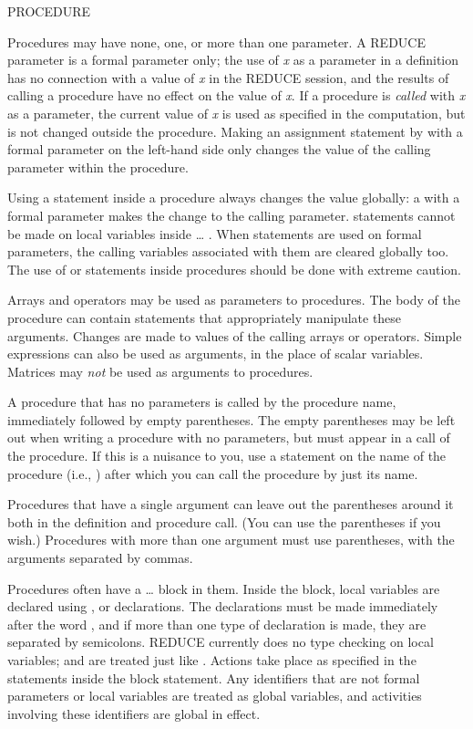 \begin{Command}[procedure]{PROCEDURE}
\begin{Comments}
Procedures may have none, one, or more than one parameter.  A REDUCE
parameter is a formal parameter only; the use of {\it x} as a parameter in
a  definition has no connection with a value of {\it x} in
the REDUCE session, and the results of calling a procedure have no effect
on the value of {\it x}.  If a procedure is {\it called} with {\it x} as a
parameter, the current value of {\it x} is used as specified in the
computation, but is not changed outside the procedure.
Making an assignment statement by \name{:=} with a
formal parameter on the left-hand side only changes the value of the
calling parameter within the procedure.

Using a  statement inside a procedure always changes the value
globally: a  with a formal parameter makes the change to the calling
parameter.   statements cannot be made on local variables inside
\ldots{} .  
When  statements are used on formal
parameters, the calling variables associated with them are cleared globally too.
The use of  or  statements inside procedures 
should be done with extreme caution.

Arrays and operators may be used as parameters to procedures.  The body of the
procedure can contain statements that appropriately manipulate these
arguments.  Changes are made to values of the calling arrays or operators.
Simple expressions can also be used as arguments, in the place of scalar
variables.  Matrices may {\it not} be used as arguments to procedures.

A procedure that has no parameters is called by the procedure name,
immediately followed by empty parentheses.  The empty parentheses may be left
out when writing a procedure with no parameters, but must appear in a call of
the procedure.  If this is a nuisance to you, use a  statement on
the name of the procedure (i.e., ) after which
you can call the procedure by just its name.

Procedures that have a single argument can leave out the parentheses around
it both in the definition and procedure call.  (You can use the parentheses if
you wish.)  Procedures with more than one argument must use parentheses, with
the arguments separated by commas.

Procedures often have a \ldots{} block in them. Inside the
block, local variables are declared using ,  or 
 declarations.  
The declarations must be made immediately after the word
, and if more than one type of declaration is made, they are
separated by semicolons.  REDUCE currently does no type checking on local
variables;  and  are treated just like .
Actions take place as specified in the statements inside the block statement.
Any identifiers that are not formal parameters or local variables are treated
as global variables, and activities involving these identifiers are global in
effect.


\end{Comments}
\end{Command}
